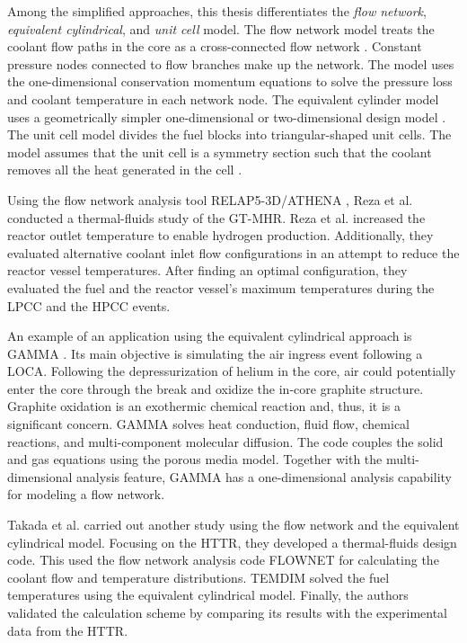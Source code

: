 Among the simplified approaches, this thesis differentiates the \textit{flow network}, \textit{equivalent cylindrical}, and \textit{unit cell} model.
The flow network model treats the coolant flow paths in the core as a cross-connected flow network \cite{shenoy_htgr_1974}.
Constant pressure nodes connected to flow branches make up the network.
The model uses the one-dimensional conservation momentum equations to solve the pressure loss and coolant temperature in each network node.
The equivalent cylinder model uses a geometrically simpler one-dimensional or two-dimensional design model \cite{shenoy_htgr_1974}\cite{tak_numerical_2008}.
The unit cell model divides the fuel blocks into triangular-shaped unit cells.
The model assumes that the unit cell is a symmetry section such that the coolant removes all the heat generated in the cell \cite{tak_numerical_2008}.

Using the flow network analysis tool RELAP5-3D/ATHENA \cite{inl_relap5-3dathena_2005}, Reza et al. \cite{reza_design_2006} conducted a thermal-fluids study of the GT-MHR.
Reza et al. increased the reactor outlet temperature to enable hydrogen production.
Additionally, they evaluated alternative coolant inlet flow configurations in an attempt to reduce the reactor vessel temperatures.
After finding an optimal configuration, they evaluated the fuel and the reactor vessel's maximum temperatures during the \gls{LPCC} and the \gls{HPCC} events.

An example of an application using the equivalent cylindrical approach is GAMMA \cite{no_multi-component_2007}.
Its main objective is simulating the air ingress event following a LOCA.
Following the depressurization of helium in the core, air could potentially enter the core through the break and oxidize the in-core graphite structure.
Graphite oxidation is an exothermic chemical reaction and, thus, it is a significant concern.
GAMMA solves heat conduction, fluid flow, chemical reactions, and multi-component molecular diffusion.
The code couples the solid and gas equations using the porous media model.
Together with the multi-dimensional analysis feature, GAMMA has a one-dimensional analysis capability for  modeling a flow network.

Takada et al. \cite{takada_core_2004} carried out another study using the flow network and the equivalent cylindrical model.
Focusing on the \gls{HTTR}, they developed a thermal-fluids design code.
This used the flow network analysis code FLOWNET \cite{maruyama_verification_1988} for calculating the coolant flow and temperature distributions.
TEMDIM \cite{maruyama_verification_1988} solved the fuel temperatures using the equivalent cylindrical model.
Finally, the authors validated the calculation scheme by comparing its results with the experimental data from the \gls{HTTR}.

